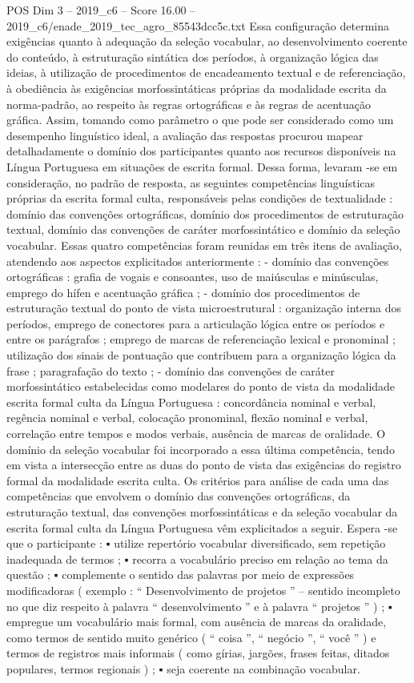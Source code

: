 \begin{textsample}{POS Dim 3 – 2019\_c6 – Score 16.00 – 2019\_c6/enade\_2019\_tec\_agro\_85543dcc5c.txt}
Essa configuração determina exigências quanto à adequação da seleção vocabular, ao desenvolvimento coerente do conteúdo, à estruturação sintática dos períodos, à organização lógica das ideias, à utilização de procedimentos de encadeamento textual e de referenciação, à obediência às exigências morfossintáticas próprias da modalidade escrita da norma-padrão, ao respeito às regras ortográficas e às regras de acentuação gráfica.
Assim, tomando como parâmetro o que pode ser considerado como um desempenho linguístico ideal, a avaliação das respostas procurou mapear detalhadamente o domínio dos participantes quanto aos recursos disponíveis na Língua Portuguesa em situações de escrita formal.
Dessa forma, levaram -se em consideração, no padrão de resposta, as seguintes competências linguísticas próprias da escrita formal culta, responsáveis pelas condições de textualidade : domínio das convenções ortográficas, domínio dos procedimentos de estruturação textual, domínio das convenções de caráter morfossintático e domínio da seleção vocabular.
Essas quatro competências foram reunidas em três itens de avaliação, atendendo aos aspectos explicitados anteriormente : - domínio das convenções ortográficas : grafia de vogais e consoantes, uso de maiúsculas e minúsculas, emprego do hífen e acentuação gráfica ; - domínio dos procedimentos de estruturação textual do ponto de vista microestrutural : organização interna dos períodos, emprego de conectores para a articulação lógica entre os períodos e entre os parágrafos ; emprego de marcas de referenciação lexical e pronominal ; utilização dos sinais de pontuação que contribuem para a organização lógica da frase ; paragrafação do texto ; - domínio das convenções de caráter morfossintático estabelecidas como modelares do ponto de vista da modalidade escrita formal culta da Língua Portuguesa : concordância nominal e verbal, regência nominal e verbal, colocação pronominal, flexão nominal e verbal, correlação entre tempos e modos verbais, ausência de marcas de oralidade.
O domínio da seleção vocabular foi incorporado a essa última competência, tendo em vista a intersecção entre as duas do ponto de vista das exigências do registro formal da modalidade escrita culta.
Os critérios para análise de cada uma das competências que envolvem o domínio das convenções ortográficas, da estruturação textual, das convenções morfossintáticas e da seleção vocabular da escrita formal culta da Língua Portuguesa vêm explicitados a seguir.
Espera -se que o participante : {\EmojiFont ▪} utilize repertório vocabular diversificado, sem repetição inadequada de termos ; {\EmojiFont ▪} recorra a vocabulário preciso em relação ao tema da questão ; {\EmojiFont ▪} complemente o sentido das palavras por meio de expressões modificadoras ( exemplo : “ Desenvolvimento de projetos ” – sentido incompleto no que diz respeito à palavra “ desenvolvimento ” e à palavra “ projetos ” ) ; {\EmojiFont ▪} empregue um vocabulário mais formal, com ausência de marcas da oralidade, como termos de sentido muito genérico ( “ coisa ”, “ negócio ”, “ você ” ) e termos de registros mais informais ( como gírias, jargões, frases feitas, ditados populares, termos regionais ) ; {\EmojiFont ▪} seja coerente na combinação vocabular.

\end{textsample}
